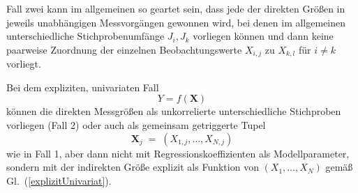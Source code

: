Fall zwei kann im allgemeinen so geartet sein, dass jede der direkten Größen in jeweils unabhängigen
Messvorgängen gewonnen wird, bei denen im allgemeinen unterschiedliche Stichprobenumfänge $J_i, J_k$ vorliegen
können und dann keine paarweise Zuordnung der einzelnen Beobachtungswerte $X_{i,j}$ zu $X_{k,l}$ für
$i \neq k$ vorliegt.

Bei dem expliziten, univariaten Fall
\begin{equation}
Y = f(\mathbf{X})
\label{explizitUnivariat}
\end{equation}
können die direkten Messgrößen als unkorrelierte unterschiedliche Stichproben vorliegen (Fall 2)
oder auch als gemeinsam getriggerte Tupel
\begin{equation}
\boldsymbol X_j \; = \; (X_{1,j}, \dots, X_{N,j})
\end{equation}
wie in Fall 1, aber dann nicht mit Regressionskoeffizienten als Modellparameter, sondern
mit der indirekten Größe explizit als Funktion von $(X_{1}, \dots, X_{N})$ gemäß
Gl.~(\ref{explizitUnivariat}).


